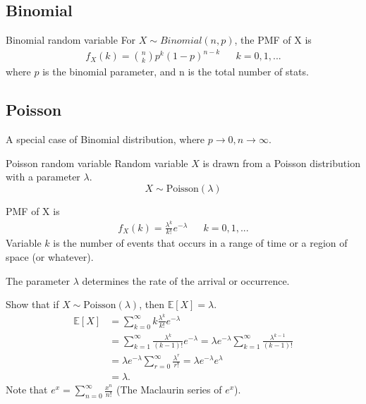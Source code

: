 \documentclass[11pt,a4paper,fleqn]{article}
\numberwithin{equation}{section}
\begin{document}
\subsection{Binomial}

\begin{fact}{Binomial random variable}{}
    For $X \sim Binomial(n,p)$, the PMF of X is
    \begin{align*}
        f_X(k) = \binom{n}{k}p^k(1-p)^{n-k} &&k=0,1,...
    \end{align*}
    where $p$ is the binomial parameter, and n is the total number of stats.
\end{fact}

\subsection{Poisson}
A special case of Binomial distribution, where $p\rightarrow0,n\rightarrow\infty$.

\begin{fact}{Poisson random variable}{}
    Random variable $X$ is drawn from a Poisson distribution with a parameter $\lambda$.
    \begin{equation*}
        X \sim \text{Poisson}(\lambda)
    \end{equation*}

    PMF of X is
    \begin{align*}
        f_X(k) =  \frac{\lambda^k}{k!}e^{-\lambda} && k = 0,1,...
    \end{align*}
    Variable $k$ is the number of events that occurs in a range of time or a region of space (or whatever).

    The parameter $\lambda$ determines the rate of the arrival or occurrence.
\end{fact}

\begin{exec}
    Show that if $X\sim \text{Poisson}(\lambda)$, then $\mathbb{E}[X]=\lambda$.
    \tcblower
    \begin{align*}
        \mathbb{E}[X]
        &= \sum_{k=0}^{\infty} k\frac{\lambda^k}{k!}e^{-\lambda}\\
        &= \sum_{k=1}^{\infty}\frac{\lambda^k}{(k-1)!}e^{-\lambda} = \lambda e^{-\lambda}\sum_{k=1}^{\infty}\frac{\lambda^{k-1}}{(k-1)!}\\
        &= \lambda e^{-\lambda}\sum_{r=0}^{\infty}\frac{\lambda^{r}}{r!} = \lambda e^{-\lambda}e^{\lambda}\\
        &= \lambda.
    \end{align*}
    Note that $e^x=\sum_{n=0}^{\infty}\frac{x^n}{n!}$ (The Maclaurin series of $e^x$).
\end{exec}
\end{document}
